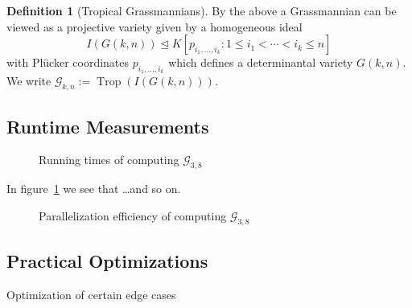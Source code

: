 \documentclass[
  paper=a4,
  DIV=14,
  fontsize=12pt,
  titlepage,
  bibliography=totoc,
  listof=totoc,
  pagesize=pdftex
]{scrartcl}
\numberwithin{figure}{section}
\numberwithin{equation}{section}
\numberwithin{table}{section}
\let\idealof\trianglelefteq
\DeclareMathOperator{\Trop}{Trop}
\theoremstyle{definition}
\newtheorem{definition}{Definition}
\numberwithin{definition}{section}
\begin{document}
\begin{definition}[Tropical Grassmannians]
  By the above a Grassmannian can be viewed as a projective variety given by a homogeneous
  ideal
  \[
    I(G(k,n)) \idealof K[ p_{i_1, \dots, i_k} : 1\leq i_1 < \cdots < i_k \leq n ]
  \]
  with Plücker coordinates $p_{i_1,\dots,i_k}$ which defines a determinantal variety $G(k,
  n)$. We write $\mathcal G_{k,n} := \Trop(I(G(k,n)))$.
\end{definition}

\subsection{Runtime Measurements}

\begin{figure}[htbp]
  \begin{center}
    
  \end{center}
  \caption{Running times of computing $\mathcal{G}_{3,8}$}
  \label{fig:g38scaling}
\end{figure}

In figure~\ref{fig:g38scaling} we see that \dots and so on.

\begin{figure}[htbp]
  \begin{center}
    
  \end{center}
  \caption{Parallelization efficiency of computing $\mathcal{G}_{3,8}$}
  \label{fig:g38efficiency}
\end{figure}

\subsection{Practical Optimizations}

Optimization of certain edge cases

\newpage
\listoffigures
\newpage%
\printbibliography
\end{document}
